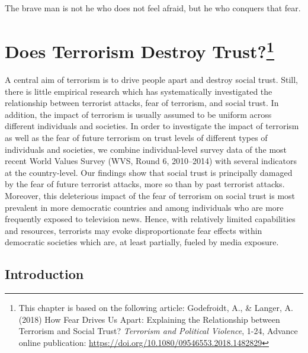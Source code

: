 \begin{savequote}[9cm]
The brave man is not he who does not feel afraid, but he who conquers that fear.
\end{savequote}

\chapter[Does Terror(ism) Destroy Trust?]{Does Terrorism Destroy Trust?\footnote{This chapter is based on the following article: Godefroidt, A., \& Langer, A. (2018) How Fear Drives Us Apart: Explaining the Relationship between Terrorism and Social Trust? \textit{Terrorism and Political Violence}, 1-24, Advance online publication: \href{https://www.tandfonline.com/doi/abs/10.1080/09546553.2018.1482829}{https://doi.org/10.1080/09546553.2018.1482829}}}
\label{chap:chap2}

\begin{chapabstract}
A central aim of terrorism is to drive people apart and destroy social trust. Still, there is little empirical research which has systematically investigated the relationship between terrorist attacks, fear of terrorism, and social trust. In addition, the impact of terrorism is usually assumed to be uniform across different individuals and societies. In order to investigate the impact of terrorism as well as the fear of future terrorism on trust levels of different types of individuals and societies, we combine individual-level survey data of the most recent World Values Survey (WVS, Round 6, 2010–2014) with several indicators at the country-level. Our findings show that social trust is principally damaged by the fear of future terrorist attacks, more so than by past terrorist attacks. Moreover, this deleterious impact of the fear of terrorism on social trust is most prevalent in more democratic countries and among individuals who are more frequently exposed to television news. Hence, with relatively limited capabilities and resources, terrorists may evoke disproportionate fear effects within democratic societies which are, at least partially, fueled by media exposure.
\end{chapabstract}


\section{Introduction}

